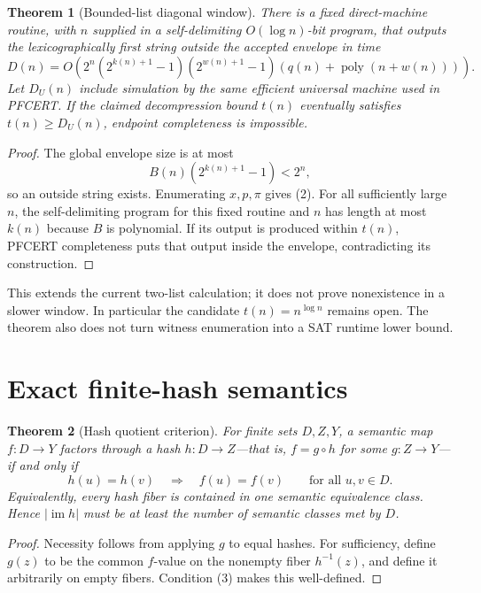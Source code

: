 \documentclass[11pt]{article}
\newtheorem{theorem}{Theorem}
\begin{document}
\begin{theorem}[Bounded-list diagonal window]
There is a fixed direct-machine routine, with $n$ supplied in a
self-delimiting $O(\log n)$-bit program, that outputs the lexicographically
first string outside the accepted envelope in time
\[
 D(n)=O\!\left(
 2^n(2^{k(n)+1}-1)(2^{w(n)+1}-1)
 (q(n)+\operatorname{poly}(n+w(n)))\right).       \tag{2}
\]
Let $D_U(n)$ include simulation by the same efficient universal machine
used in PFCERT.  If the claimed decompression bound $t(n)$ eventually
satisfies $t(n)\ge D_U(n)$, endpoint completeness is impossible.
\end{theorem}
\begin{proof}
The global envelope size is at most
\[
 B(n)(2^{k(n)+1}-1)<2^n,
\]
so an outside string exists.  Enumerating $x,p,\pi$ gives (2).  For all
sufficiently large $n$, the self-delimiting program for this fixed routine
and $n$ has length at most $k(n)$ because $B$ is polynomial.  If its output
is produced within $t(n)$, PFCERT completeness puts that output inside the
envelope, contradicting its construction.
\end{proof}

This extends the current two-list calculation; it does not prove
nonexistence in a slower window.  In particular the candidate
$t(n)=n^{\log n}$ remains open.  The theorem also does not turn witness
enumeration into a SAT runtime lower bound.

\section{Exact finite-hash semantics}
\begin{theorem}[Hash quotient criterion]
For finite sets $D,Z,Y$, a semantic map $f:D\to Y$ factors through a hash
$h:D\to Z$---that is, $f=g\circ h$ for some $g:Z\to Y$---if and only if
\[
 h(u)=h(v)\quad\Longrightarrow\quad f(u)=f(v)
 \qquad\text{for all }u,v\in D.                 \tag{3}
\]
Equivalently, every hash fiber is contained in one semantic equivalence
class.  Hence $|\operatorname{im}h|$ must be at least the number of
semantic classes met by $D$.
\end{theorem}
\begin{proof}
Necessity follows from applying $g$ to equal hashes.  For sufficiency,
define $g(z)$ to be the common $f$-value on the nonempty fiber $h^{-1}(z)$,
and define it arbitrarily on empty fibers.  Condition (3) makes this
well-defined.
\end{proof}
\end{document}
